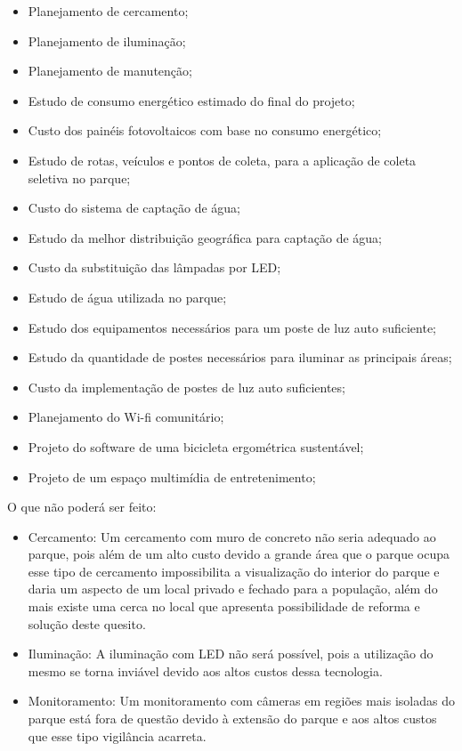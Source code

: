 \begin{itemize}
        \item Planejamento de cercamento;
	\item Planejamento de ilumina\c{c}\~ao;
	\item Planejamento de manuten\c{c}\~ao;
	\item Estudo de consumo energ\'etico estimado do final do projeto;
	\item Custo dos pain\'eis fotovoltaicos com base no consumo energ\'etico;
	\item Estudo de rotas, ve\'iculos e pontos de coleta, para a aplica\c{c}\~ao de coleta seletiva no parque;
	\item Custo do sistema de capta\c{c}\~ao de \'agua;
	\item Estudo da melhor distribui\c{c}\~ao geogr\'afica para capta\c{c}\~ao de \'agua;
	\item Custo da substitui\c{c}\~ao das l\^ampadas por LED;
	\item Estudo de \'agua utilizada no parque;
	\item Estudo dos equipamentos necess\'arios para um poste de luz auto suficiente;
	\item Estudo da quantidade de postes necess\'arios para iluminar as principais \'areas;
	\item Custo da implementa\c{c}\~ao de postes de luz auto suficientes;
	\item Planejamento do Wi-fi comunit\'ario;
	\item Projeto do software de uma bicicleta ergom\'etrica sustent\'avel;
	\item Projeto de um espa\c{c}o multim\'idia de entretenimento;
\end{itemize}

O que n\~ao poder\'a ser feito:

\begin{itemize}
        \item Cercamento: Um cercamento com muro de concreto n\~ao seria adequado ao parque, pois al\'em de um alto custo devido a grande \'area que o parque ocupa esse tipo de cercamento impossibilita a visualiza\c{c}\~ao do interior do parque e daria um aspecto de um local privado e fechado para a popula\c{c}\~ao, al\'em do mais existe uma cerca no local que apresenta possibilidade de reforma e solu\c{c}\~ao deste quesito.
	\item Ilumina\c{c}\~ao: A ilumina\c{c}\~ao com LED n\~ao ser\'a poss\'ivel, pois a utiliza\c{c}\~ao do mesmo se torna invi\'avel devido aos altos custos dessa tecnologia.
	\item Monitoramento: Um monitoramento com c\^ameras em regi\~oes mais isoladas do parque est\'a fora de quest\~ao devido \`a extens\~ao do parque e aos altos custos que esse tipo vigil\^ancia acarreta. \\ \\ \\ \\
\end{itemize}

